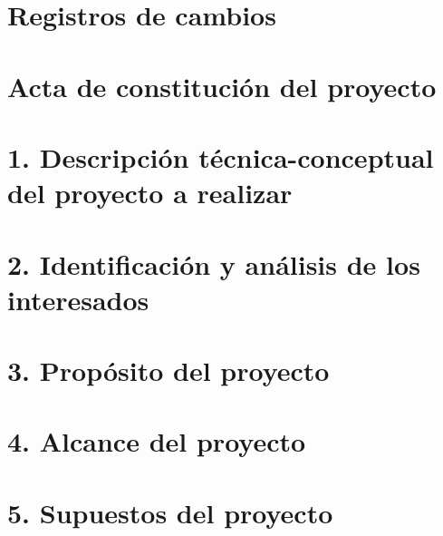 \documentclass[
11pt, %
codirector, %
]{charter}
\begin{document}
\maketitle
\thispagestyle{empty}
\pagebreak

\thispagestyle{empty}
{\setlength{\parskip}{0pt}
	\tableofcontents{}
}
\pagebreak

\section*{Registros de cambios}
\label{sec:registro}



\pagebreak

\section*{Acta de constitución del proyecto}
\label{sec:acta}



\section{1. Descripción técnica-conceptual del proyecto a realizar}
\label{sec:descripcion}



\section{2. Identificación y análisis de los interesados}
\label{sec:interesados}



\section{3. Propósito del proyecto}
\label{sec:proposito}



\section{4. Alcance del proyecto}
\label{sec:alcance}



\section{5. Supuestos del proyecto}
\label{sec:supuestos}
\end{document}
